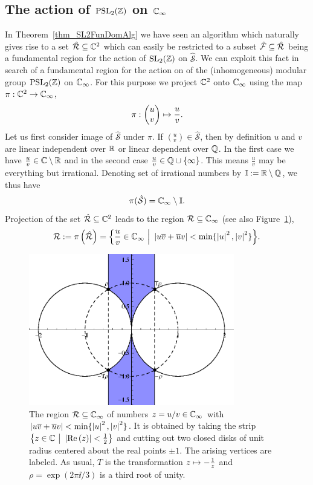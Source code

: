 \subsection{The action of $\operatorname{PSL}_{2}(\mathbb{Z})$ on $\mathbb{C}_{\infty}$}

In Theorem~\ref{thm_SL2FunDomAlg} we have seen an algorithm which naturally gives rise to a set $\hat{\mathcal{R}} \subseteq \mathbb{C}^2$ which can easily be restricted to a subset $\hat{\mathcal{F}} \subseteq \hat{\mathcal{R}}$ being a fundamental region for the action of $\operatorname{SL}_{2}(\mathbb{Z})$ on $\hat{\mathcal{S}}$. We can exploit this fact in search of a fundamental region for the action on of the (inhomogeneous) modular group $\operatorname{PSL}_{2}(\mathbb{Z})$ on $\mathbb{C}_{\infty}$. For this purpose we project $\mathbb{C}^2$ onto $\mathbb{C}_{\infty}$ using the map $\pi : \mathbb{C}^2 \to \mathbb{C}_{\infty}$,
\begin{equation}
\pi : \begin{pmatrix}u \\ v\end{pmatrix} \mapsto \frac{u}{v}.
\end{equation}
Let us first consider image of $\hat{\mathcal{S}}$ under $\pi$. If $({}^u_v) \in \hat{\mathcal{S}}$, then by definition $u$ and $v$ are linear independent over $\mathbb{R}$ or linear dependent over $\mathbb{Q}$. In the first case we have $\frac{u}{v} \in \mathbb{C} \setminus \mathbb{R}$ and in the second case $\frac{u}{v} \in \mathbb{Q} \cup \{\infty\}$. This means $\frac{u}{v}$ may be everything but irrational. Denoting set of irrational numbers by $\mathbb{I} := \mathbb{R} \setminus \mathbb{Q}$, we thus have
\begin{equation*}
\pi(\hat{\mathcal{S}}) = \mathbb{C}_{\infty} \setminus \mathbb{I}.
\end{equation*}
Projection of the set $\hat{\mathcal{R}} \subseteq \mathbb{C}^2$ leads to the region $\mathcal{R} \subseteq \mathbb{C}_{\infty}$ (see also Figure~\ref{fig_PSL2MinRegion}),
\begin{equation}
\label{eqn_PSL2MinRegion}
\mathcal{R} := \pi\left(\hat{\mathcal{R}}\right) = 
\Big\{ \frac{u}{v} \in \mathbb{C}_{\infty} \ \Big| \ \left|u\overline{v} + \overline{u}v\right| < \min\{\left|u\right|^2, \left|v\right|^2\} \Big\}.
\end{equation}
\begin{figure}
\centering
\includegraphics[width=0.8\textwidth]{figures/minimal-region}
\caption{The region $\mathcal{R} \subseteq \mathbb{C}_{\infty}$ of numbers $z = u/v \in \mathbb{C}_{\infty}$ with $\left|u\overline{v} + \overline{u}v\right| < \min\{\left|u\right|^2,\left|v\right|^2\}$. It is obtained by taking the strip $\big\{ z \in \mathbb{C} \ \big| \ \left|\operatorname{Re}\left(z\right)\right| < \frac{1}{2} \big\}$  and cutting out two closed disks of unit radius centered about the real points $\pm 1$. The arising vertices are labeled. As usual, $T$ is the transformation $z \mapsto -\frac{1}{z}$ and $\rho = \exp(2 \pi \ii / 3)$ is a third root of unity.}
\label{fig_PSL2MinRegion}
\end{figure}
